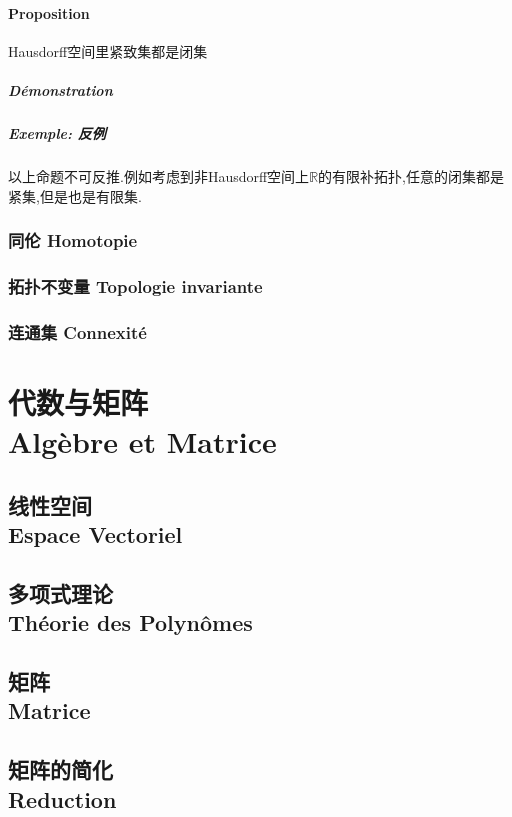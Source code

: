 \documentclass[12pt, a4paper, oneside]{ctexbook}
\newcommand{\R }{\mathbb{R}}%
\begin{document}
  \subsection{Proposition}
  Hausdorff空间里紧致集都是闭集
  \subsubsection{Démonstration}


  \subsubsection{Exemple: 反例}
  以上命题不可反推.例如考虑到非Hausdorff空间上$\R$的有限补拓扑,任意的闭集都是紧集,但是也是有限集.

  \section{同伦 Homotopie}
  \section{拓扑不变量 Topologie invariante}
  \section{连通集 Connexité}


\part{代数与矩阵\\ Algèbre et Matrice}
\chapter{线性空间 \\Espace Vectoriel}

\chapter{多项式理论\\ Théorie des Polynômes}
\chapter{矩阵 \\ Matrice}
\chapter{矩阵的简化\\Reduction}
\end{document}

